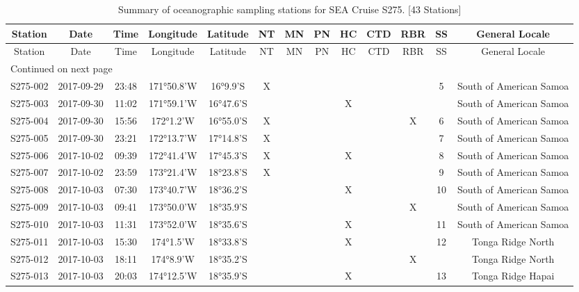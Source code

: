 \begin{longtable}{ccccccccccccc}
\caption{\label{stationSummary} Summary of oceanographic sampling stations for SEA Cruise S275. [43 Stations]} \\ 
 Station & Date & Time & Longitude & Latitude & NT & MN & PN & HC & CTD & RBR & SS & General Locale \\ 
  \hline\n\endfirsthead
Station & Date & Time & Longitude & Latitude & NT & MN & PN & HC & CTD & RBR & SS & General Locale \\ 
\hline
\endhead
\hline
\multicolumn{13}{l}{\footnotesize Continued on next page}
\endfoot
\endlastfoot
 \hline
S275-001 & 2017-09-29 & 10:22 & 171°28.6'W & 15°33.2'S & X &  &  & X &  &  & 4 & South of American Samoa \\ 
  S275-002 & 2017-09-29 & 23:48 & 171°50.8'W & 16°9.9'S & X &  &  &  &  &  & 5 & South of American Samoa \\ 
  S275-003 & 2017-09-30 & 11:02 & 171°59.1'W & 16°47.6'S &  &  &  & X &  &  &  & South of American Samoa \\ 
  S275-004 & 2017-09-30 & 15:56 & 172°1.2'W & 16°55.0'S & X &  &  &  &  & X & 6 & South of American Samoa \\ 
  S275-005 & 2017-09-30 & 23:21 & 172°13.7'W & 17°14.8'S & X &  &  &  &  &  & 7 & South of American Samoa \\ 
  S275-006 & 2017-10-02 & 09:39 & 172°41.4'W & 17°45.3'S & X &  &  & X &  &  & 8 & South of American Samoa \\ 
  S275-007 & 2017-10-02 & 23:59 & 173°21.4'W & 18°23.8'S & X &  &  &  &  &  & 9 & South of American Samoa \\ 
  S275-008 & 2017-10-03 & 07:30 & 173°40.7'W & 18°36.2'S &  &  &  & X &  &  & 10 & South of American Samoa \\ 
  S275-009 & 2017-10-03 & 09:41 & 173°50.0'W & 18°35.9'S &  &  &  &  &  & X &  & South of American Samoa \\ 
  S275-010 & 2017-10-03 & 11:31 & 173°52.0'W & 18°35.6'S &  &  &  & X &  &  & 11 & South of American Samoa \\ 
  S275-011 & 2017-10-03 & 15:30 & 174°1.5'W & 18°33.8'S &  &  &  & X &  &  & 12 & Tonga Ridge North \\ 
  S275-012 & 2017-10-03 & 18:11 & 174°8.9'W & 18°35.2'S &  &  &  &  &  & X &  & Tonga Ridge North \\ 
  S275-013 & 2017-10-03 & 20:03 & 174°12.5'W & 18°35.9'S &  &  &  & X &  &  & 13 & Tonga Ridge Hapai \\ 

\end{longtable}
